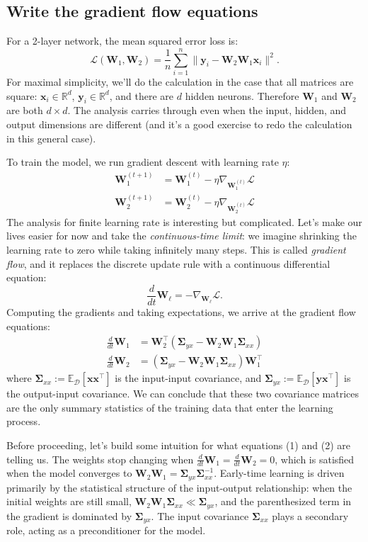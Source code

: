 \documentclass[12pt]{article}
\newcommand{\vx}{\mathbf{x}}
\newcommand{\vy}{\mathbf{y}}
\newcommand{\mW}{\mathbf{W}}
\newcommand{\mSigma}{\boldsymbol{\Sigma}}
\newcommand{\E}{\mathbb{E}}
\begin{document}
\subsection{Write the gradient flow equations}

For a 2-layer network, the mean squared error loss is:
\begin{equation}
    \mathcal{L}(\mW_1, \mW_2) = \frac{1}{n} \sum_{i=1}^{n} \|\vy_i - \mW_2 \mW_1 \vx_i\|^2.
\end{equation}
For maximal simplicity, we'll do the calculation in the case that all matrices are square: $\vx_i \in \mathbb{R}^d$, $\vy_i \in \mathbb{R}^d$, and there are $d$ hidden neurons. Therefore $\mW_1$ and $\mW_2$ are both $d \times d$. The analysis carries through even when the input, hidden, and output dimensions are different (and it's a good exercise to redo the calculation in this general case).

To train the model, we run gradient descent with learning rate $\eta$:
\begin{align}
    \mW_1^{(t+1)} &= \mW_1^{(t)} - \eta \nabla_{\mW_1^{(t)}}{\mathcal{L}} \\
    \mW_2^{(t+1)} &= \mW_2^{(t)} - \eta \nabla_{\mW_2^{(t)}}{\mathcal{L}}
\end{align}
The analysis for finite learning rate is interesting but complicated. Let's make our lives easier for now and take the \emph{continuous-time limit}: we imagine shrinking the learning rate to zero while taking infinitely many steps. This is called \emph{gradient flow}, and it replaces the discrete update rule with a continuous differential equation:
\begin{equation}
    \frac{d}{dt}\mW_\ell = -\nabla_{\mW_\ell}{\mathcal{L}}.
\end{equation}
Computing the gradients and taking expectations, we arrive at the gradient flow equations:
\begin{align}
    \frac{d}{dt}\mW_1 &= \mW_2^\top(\mSigma_{yx} - \mW_2 \mW_1 \mSigma_{xx}) \tag{1} \\
    \frac{d}{dt}\mW_2 &= (\mSigma_{yx} - \mW_2 \mW_1 \mSigma_{xx}) \mW_1^\top \tag{2}
\end{align}
where $\mSigma_{xx}:=\E_\mathcal{D}[\vx\vx^\top]$ is the input-input covariance, and $\mSigma_{yx}:=\E_\mathcal{D}[\vy\vx^\top]$ is the output-input covariance. We can conclude that these two covariance matrices are the only summary statistics of the training data that enter the learning process.

Before proceeding, let's build some intuition for what equations (1) and (2) are telling us. The weights stop changing when $\frac{d}{dt}\mW_1 = \frac{d}{dt} \mW_2 = 0$, which is satisfied when the model converges to $\mW_2 \mW_1 = \mSigma_{yx} \mSigma_{xx}^{-1}$. Early-time learning is driven primarily by the statistical structure of the input-output relationship: when the initial weights are still small, $\mW_2 \mW_1 \mSigma_{xx} \ll \mSigma_{yx}$, and the parenthesized term in the gradient is dominated by $\mSigma_{yx}$. The input covariance $\mSigma_{xx}$ plays a secondary role, acting as a preconditioner for the model.
\end{document}

